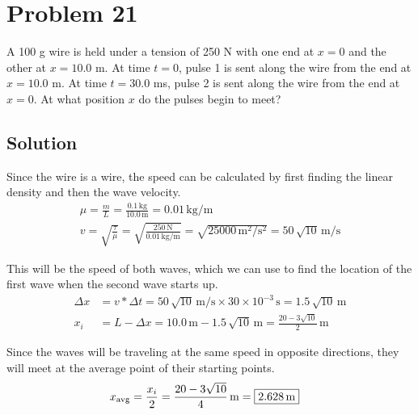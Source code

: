 \documentclass[12pt]{article}
\newcommand{\E}[1]{\times 10^{#1}}
\begin{document}
    \pagebreak
    \section{Problem 21}
        A 100 g wire is held under a tension of 250 N with one end at $x = 0$ and the other at $x = 10.0$ m. 
        At time $t = 0$, pulse 1 is sent along the wire from the end at $x = 10.0$ m. 
        At time $t = 30.0$ ms, pulse 2 is sent along the wire from the end at $x = 0$. 
        At what position $x$ do the pulses begin to meet?

        \subsection{Solution}
            Since the wire is a wire, the speed can be calculated by first finding the linear density and then the wave velocity. 
            \begin{gather}
                \mu =   \frac{m}{L}
                    =   \frac{0.1\,\unit{\kilo\gram}}{10.0\,\unit{\meter}}
                    =   0.01\,\unit{\kilo\gram/\meter}\\
                v   =   \sqrt{\frac{\tau}{\mu}}
                    =   \sqrt{\frac{250\,\unit{\newton}}{0.01\,\unit{\kilo\gram/\meter}}}
                    =   \sqrt{25000\,\unit{\meter^2/\second^2}}
                    =   50\,\sqrt{10}\,\unit{\meter/\second}
            \end{gather}

            This will be the speed of both waves, which we can use to find the location of the first wave when the second wave starts up.
            \begin{align}
                \Delta x    &=  v * \Delta t
                    =   50\,\sqrt{10}\,\unit{\meter/\second} \times 30\E{-3}\,\unit{\second}
                    =   1.5\,\sqrt{10}\,\unit{\meter}\\
                x_i &=  L - \Delta x
                    =   10.0\,\unit{\meter} - 1.5\,\sqrt{10}\,\unit{\meter}
                    =   \frac{20 - 3\sqrt{10}}{2}\,\unit{\meter}
            \end{align}

            Since the waves will be traveling at the same speed in opposite directions, they will meet at the average point of their starting points. 
            \begin{align}
                x_{\rm avg} &=  \frac{x_i}{2}
                    =   \frac{20 - 3\sqrt{10}}{4}\,\unit{\meter}
                    =   \boxed{2.628\,\unit{\meter}}
            \end{align}
\end{document}
